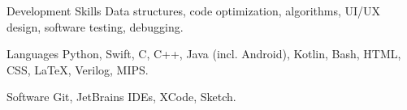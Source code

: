 
\begin{cvskills}

  \cvskill
    {Development Skills} %
    {Data structures, code optimization, algorithms, UI/UX design, software testing, debugging. } %

  \cvskill
    {Languages} %
    {Python, Swift, C, C++, Java (incl. Android), Kotlin, Bash, HTML, CSS, LaTeX, Verilog, MIPS.} %

  \cvskill
    {Software} %
    {Git, JetBrains IDEs, XCode, Sketch.} %

\end{cvskills}
